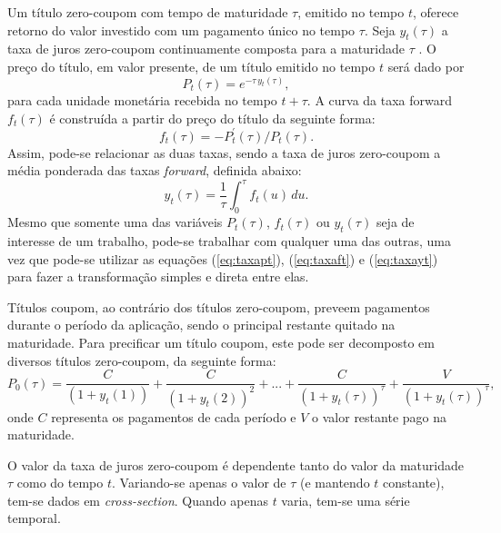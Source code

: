 \documentclass[
	12pt,				%
	openright,			%
	oneside,			%
	a4paper,			%
	english,			%
	brazil				%
	]{dissertacao-ufrgs-abntex2}
\begin{document}
Um título zero-coupom com tempo de maturidade $\tau$, emitido no tempo $t$, oferece retorno do valor investido com um pagamento único no tempo $\tau$. Seja $y_{t}(\tau)$ a taxa de juros zero-coupom continuamente composta para a maturidade $\tau$ . O preço do título, em valor presente, de um título emitido no tempo $t$ será dado por
\begin{equation}
P_{t}(\tau)=e^{-\tau\, y_{t}(\tau)},\label{eq:taxapt}
\end{equation}
para cada unidade monetária recebida no tempo $t + \tau$. A curva da
taxa forward $f_{t}(\tau)$ é construída a partir do preço do título
da seguinte forma:
\begin{equation}
f_{t}(\tau)=-P_{t}^{\prime}(\tau)/P_{t}(\tau).\label{eq:taxaft}
\end{equation}
Assim, pode-se relacionar as duas taxas, sendo a taxa de juros zero-coupom
a média ponderada das taxas \emph{forward}, definida abaixo:
\begin{equation}
y_{t}(\tau)=\frac{1}{\tau}\int_{0}^{\tau}f_{t}(u)\, du.\label{eq:taxayt}
\end{equation}
Mesmo que somente uma das variáveis $P_{t}(\tau)$,\foreignlanguage{english}{ $f_{t}(\tau)$} ou $y_{t}(\tau)$ seja de interesse de um trabalho, pode-se trabalhar com qualquer uma das outras, uma vez que pode-se utilizar as equações (\ref{eq:taxapt}), (\ref{eq:taxaft}) e (\ref{eq:taxayt}) para fazer a transformação simples e direta entre elas. 

Títulos coupom, ao contrário dos títulos zero-coupom, preveem pagamentos durante o período da aplicação, sendo o principal restante quitado na maturidade. Para precificar um título coupom, este pode ser decomposto em diversos títulos zero-coupom, da seguinte forma:
\[
P_{0}(\tau)=\frac{C}{(1+y_{t}(1))}+\frac{C}{(1+y_{t}(2))^{2}}+...+\frac{C}{(1+y_{t}(\tau))^{\tau}}+\frac{V}{(1+y_{t}(\tau))^{\tau}},
\]
onde $C$ representa os pagamentos de cada período e $V$ o valor
restante pago na maturidade.

O valor da taxa de juros zero-coupom é dependente tanto do valor da maturidade $\tau$ como do tempo $t$. 
Variando-se apenas o valor de $\tau$ (e mantendo $t$ constante),
tem-se dados em \emph{cross-section}. Quando apenas $t$ varia, tem-se
uma série temporal.

\end{document}
